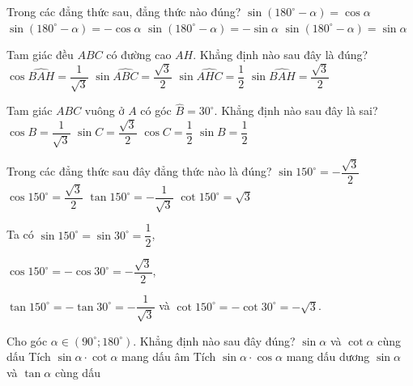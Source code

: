 \begin{ex}%
	Trong các đẳng thức sau, đẳng thức nào đúng?
	\choice
	{$\sin \left(180^{\circ}-\alpha \right)=\cos \alpha$}
	{$\sin \left(180^{\circ}-\alpha \right)=-\cos \alpha$}
	{$\sin \left(180^{\circ}-\alpha \right)=-\sin \alpha$}
	{\True $\sin \left(180^{\circ}-\alpha \right)=\sin \alpha$}
	\loigiai{
	}
\end{ex}


\begin{ex}%
	Tam giác đều $ABC$ có đường cao $AH$. Khẳng định nào sau đây là đúng?
	\choice
	{$\cos \widehat{BAH}=\dfrac{1}{\sqrt{3}}$}
	{\True $\sin \widehat{ABC}=\dfrac{\sqrt{3}}{2}$}
	{$\sin \widehat{AHC}=\dfrac{1}{2}$}
	{$\sin \widehat{BAH}=\dfrac{\sqrt{3}}{2}$}
\end{ex}


\begin{ex}%
	Tam giác $ABC$ vuông ở $A$ có góc $\widehat{B}=30^{\circ}$. Khẳng định nào sau đây là sai?
	\choice
	{\True $\cos B=\dfrac{1}{\sqrt{3}}$}
	{$\sin C=\dfrac{\sqrt{3}}{2}$}
	{$\cos C=\dfrac{1}{2}$}
	{$\sin B=\dfrac{1}{2}$}
\end{ex}

\begin{ex}%
	Trong các đẳng thức sau đây đẳng thức nào là đúng?
	\choice
	{$\sin 150^{\circ}=-\dfrac{\sqrt{3}}{2}$}
	{$\cos 150^{\circ}=\dfrac{\sqrt{3}}{2}$}
	{\True $\tan 150^{\circ}=-\dfrac{1}{\sqrt{3}}$}
	{$\cot 150^{\circ}=\sqrt{3}$}
	{\True Ta có $\sin 150^{\circ}=\sin 30^{\circ}=\dfrac{1}{2}$,
		
		$\cos 150^{\circ}=-\cos 30^{\circ}=-\dfrac{\sqrt{3}}{2}$,
		
		
		$\tan 150^{\circ}=-\tan 30^{\circ}=-\dfrac{1}{\sqrt{3}}$ và $\cot 150^{\circ}=-\cot 30^{\circ}=-\sqrt{3}$.
	}
\end{ex}


\begin{ex}%
	Cho góc $\alpha \in \left(90^{\circ};180^{\circ} \right)$. Khẳng định nào sau đây đúng?
	\choice
	{$\sin \alpha$ và $\cot \alpha$ cùng dấu}
	{\True Tích $\sin \alpha \cdot \cot \alpha$ mang dấu âm}
	{Tích $\sin \alpha  \cdot \cos \alpha$ mang dấu dương}
	{$\sin \alpha$ và $\tan \alpha$ cùng dấu}
\end{ex}

